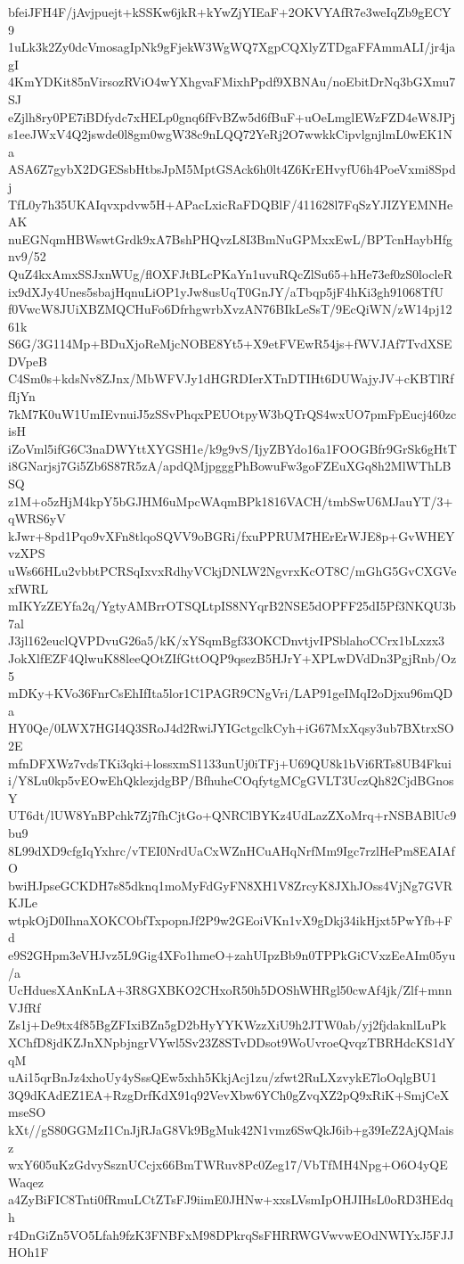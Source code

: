 bfeiJFH4F/jAvjpuejt+kSSKw6jkR+kYwZjYIEaF+2OKVYAfR7e3weIqZb9gECY9
1uLk3k2Zy0dcVmosagIpNk9gFjekW3WgWQ7XgpCQXlyZTDgaFFAmmALI/jr4jagI
4KmYDKit85nVirsozRViO4wYXhgvaFMixhPpdf9XBNAu/noEbitDrNq3bGXmu7SJ
eZjlh8ry0PE7iBDfydc7xHELp0gnq6fFvBZw5d6fBuF+uOeLmglEWzFZD4eW8JPj
s1eeJWxV4Q2jswde0l8gm0wgW38c9nLQQ72YeRj2O7wwkkCipvlgnjlmL0wEK1Na
ASA6Z7gybX2DGESsbHtbsJpM5MptGSAck6h0lt4Z6KrEHvyfU6h4PoeVxmi8Spdj
TfL0y7h35UKAIqvxpdvw5H+APacLxicRaFDQBlF/411628l7FqSzYJIZYEMNHeAK
nuEGNqmHBWswtGrdk9xA7BshPHQvzL8I3BmNuGPMxxEwL/BPTcnHaybHfgnv9/52
QuZ4kxAmxSSJxnWUg/flOXFJtBLcPKaYn1uvuRQcZlSu65+hHe73ef0zS0locleR
ix9dXJy4Unes5sbajHqnuLiOP1yJw8usUqT0GnJY/aTbqp5jF4hKi3gh91068TfU
f0VwcW8JUiXBZMQCHuFo6DfrhgwrbXvzAN76BIkLeSsT/9EcQiWN/zW14pj1261k
S6G/3G114Mp+BDuXjoReMjcNOBE8Yt5+X9etFVEwR54js+fWVJAf7TvdXSEDVpeB
C4Sm0s+kdsNv8ZJnx/MbWFVJy1dHGRDIerXTnDTIHt6DUWajyJV+cKBTlRffIjYn
7kM7K0uW1UmIEvnuiJ5zSSvPhqxPEUOtpyW3bQTrQS4wxUO7pmFpEucj460zcisH
iZoVml5ifG6C3naDWYttXYGSH1e/k9g9vS/IjyZBYdo16a1FOOGBfr9GrSk6gHtT
i8GNarjsj7Gi5Zb6S87R5zA/apdQMjpgggPhBowuFw3goFZEuXGq8h2MlWThLBSQ
z1M+o5zHjM4kpY5bGJHM6uMpcWAqmBPk1816VACH/tmbSwU6MJauYT/3+qWRS6yV
kJwr+8pd1Pqo9vXFn8tlqoSQVV9oBGRi/fxuPPRUM7HErErWJE8p+GvWHEYvzXPS
uWs66HLu2vbbtPCRSqIxvxRdhyVCkjDNLW2NgvrxKcOT8C/mGhG5GvCXGVexfWRL
mIKYzZEYfa2q/YgtyAMBrrOTSQLtpIS8NYqrB2NSE5dOPFF25dI5Pf3NKQU3b7al
J3jl162euclQVPDvuG26a5/kK/xYSqmBgf33OKCDnvtjvIPSblahoCCrx1bLxzx3
JokXlfEZF4QlwuK88leeQOtZIfGttOQP9qsezB5HJrY+XPLwDVdDn3PgjRnb/Oz5
mDKy+KVo36FnrCsEhIfIta5lor1C1PAGR9CNgVri/LAP91geIMqI2oDjxu96mQDa
HY0Qe/0LWX7HGI4Q3SRoJ4d2RwiJYIGctgclkCyh+iG67MxXqsy3ub7BXtrxSO2E
mfnDFXWz7vdsTKi3qki+lossxmS1133unUj0iTFj+U69QU8k1bVi6RTs8UB4Fkui
i/Y8Lu0kp5vEOwEhQklezjdgBP/BfhuheCOqfytgMCgGVLT3UczQh82CjdBGnosY
UT6dt/lUW8YnBPchk7Zj7fhCjtGo+QNRClBYKz4UdLazZXoMrq+rNSBABlUc9bu9
8L99dXD9cfgIqYxhrc/vTEI0NrdUaCxWZnHCuAHqNrfMm9Igc7rzlHePm8EAIAfO
bwiHJpseGCKDH7s85dknq1moMyFdGyFN8XH1V8ZrcyK8JXhJOss4VjNg7GVRKJLe
wtpkOjD0IhnaXOKCObfTxpopnJf2P9w2GEoiVKn1vX9gDkj34ikHjxt5PwYfb+Fd
e9S2GHpm3eVHJvz5L9Gig4XFo1hmeO+zahUIpzBb9n0TPPkGiCVxzEeAIm05yu/a
UcHduesXAnKnLA+3R8GXBKO2CHxoR50h5DOShWHRgl50cwAf4jk/Zlf+mnnVJfRf
Zs1j+De9tx4f85BgZFIxiBZn5gD2bHyYYKWzzXiU9h2JTW0ab/yj2fjdaknlLuPk
XChfD8jdKZJnXNpbjngrVYwl5Sv23Z8STvDDsot9WoUvroeQvqzTBRHdcKS1dYqM
uAi15qrBnJz4xhoUy4ySssQEw5xhh5KkjAcj1zu/zfwt2RuLXzvykE7loOqlgBU1
3Q9dKAdEZ1EA+RzgDrfKdX91q92VevXbw6YCh0gZvqXZ2pQ9xRiK+SmjCeXmseSO
kXt//gS80GGMzI1CnJjRJaG8Vk9BgMuk42N1vmz6SwQkJ6ib+g39IeZ2AjQMaisz
wxY605uKzGdvySsznUCcjx66BmTWRuv8Pc0Zeg17/VbTfMH4Npg+O6O4yQEWaqez
a4ZyBiFIC8Tnti0fRmuLCtZTsFJ9iimE0JHNw+xxsLVsmIpOHJIHsL0oRD3HEdqh
r4DnGiZn5VO5Lfah9fzK3FNBFxM98DPkrqSsFHRRWGVwvwEOdNWIYxJ5FJJHOh1F
